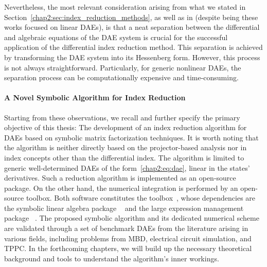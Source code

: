 Nevertheless, the most relevant consideration arising from what we stated in Section~\ref{chap2:sec:index_reduction_methods}, as well as in \citet{bojarincev1980regular, gear1984ode, griepentrog1989basic} (despite being these works focused on linear \acp{DAE}), is that a neat separation between the differential and algebraic equations of the \ac{DAE} system is crucial for the successful application of the differential index reduction method. This separation is achieved by transforming the \ac{DAE} system into its Hessenberg form. However, this process is not always straightforward. Particularly, for generic nonlinear \acp{DAE}, the separation process can be computationally expensive and time-consuming.

\paragraph{A Novel Symbolic Algorithm for Index Reduction}

Starting from these observations, we recall and further specify the primary objective of this thesis: The development of an index reduction algorithm for \acp{DAE} based on symbolic matrix factorization techniques. It is worth noting that the algorithm is neither directly based on the projector-based analysis nor in index concepts other than the differential index. The algorithm is limited to generic well-determined \acp{DAE} of the form~\eqref{chap2:eq:dae}, linear in the states' derivatives. Such a reduction algorithm is implemented as an open-source \Maple{} package. On the other hand, the numerical integration is performed by an open-source \Matlab{} toolbox. Both software constitutes the \Indigo{} toolbox~\cite{indigo}, whose dependencies are the symbolic linear algebra package \LAST{}~\cite{last} and the large expression management package \LEM{}~\cite{lem}. The proposed symbolic algorithm and its dedicated numerical scheme are validated through a set of benchmark \acp{DAE} from the literature arising in various fields, including problems from \ac{MBD}, electrical circuit simulation, and \ac{TPPC}. In the forthcoming chapters, we will build up the necessary theoretical background and tools to understand the algorithm's inner workings.

